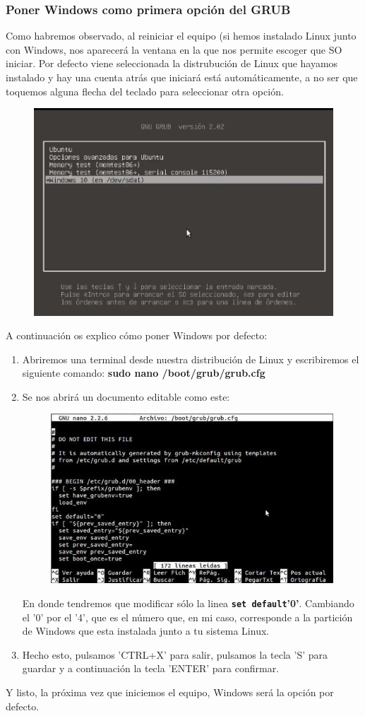 \subsubsection{Poner Windows como primera opción del GRUB}
Como habremos observado, al reiniciar el equipo (si hemos instalado Linux junto con Windows, nos aparecerá la ventana en la que nos permite escoger que SO iniciar.
\newline Por defecto viene seleccionada la distrubución de Linux que hayamos instalado y hay una cuenta atrás que iniciará está automáticamente, a no ser que toquemos alguna flecha del teclado para seleccionar otra opción.
\begin{figure}[H]
        \centering
        \includegraphics[width= 0.7 \textwidth]{Media/grub.png}
\end{figure}
\newline A continuación os explico cómo poner Windows por defecto:
\begin{enumerate}
    \item Abriremos una terminal desde nuestra distribución de Linux y escribiremos el siguiente comando: \textbf{sudo nano /boot/grub/grub.cfg}
    \item Se nos abrirá un documento editable como este:
    \begin{figure}[H]
        \centering
        \includegraphics[width= 0.7 \textwidth]{Media/grubload.png}
    \end{figure}
    En donde tendremos que modificar sólo la linea \textbf{\verb=set default='0'}. Cambiando el '0' por el '4', que es el número que, en mi caso, corresponde a la partición de Windows que esta instalada junto a tu sistema Linux.
    \item Hecho esto, pulsamos 'CTRL+X' para salir, pulsamos la tecla 'S' para guardar y a continuación la tecla 'ENTER' para confirmar.
\end{enumerate}
Y listo, la próxima vez que iniciemos el equipo, Windows será la opción por defecto.